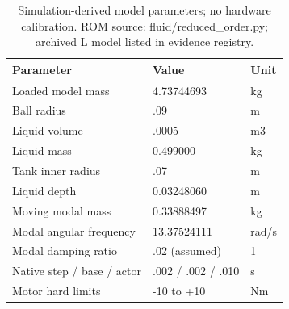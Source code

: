 \begin{table}[t]
\centering\small
\caption{Simulation-derived model parameters; no hardware calibration. ROM source: fluid/reduced\_order.py; archived L model listed in evidence registry.}
\label{tab:parameters}
\begin{tabular}{lll}
\hline
Parameter & Value & Unit \\
\hline
Loaded model mass & 4.73744693 & kg \\
Ball radius & .09 & m \\
Liquid volume & .0005 & m3 \\
Liquid mass & 0.499000 & kg \\
Tank inner radius & .07 & m \\
Liquid depth & 0.03248060 & m \\
Moving modal mass & 0.33888497 & kg \\
Modal angular frequency & 13.37524111 & rad/s \\
Modal damping ratio & .02 (assumed) & 1 \\
Native step / base / actor & .002 / .002 / .010 & s \\
Motor hard limits & -10 to +10 & Nm \\
\hline
\end{tabular}
\end{table}
